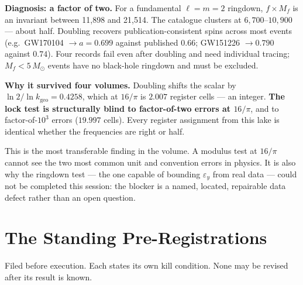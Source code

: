 \documentclass[11pt, letterpaper, openany]{book}
\newcommand{\kgeo}{k_{\mathrm{geo}}}
\begin{document}
\begin{formbox}
\textbf{Diagnosis: a factor of two.} For a fundamental $\ell=m=2$ ringdown, $f \times M_f$ is an
invariant between 11{,}898 and 21{,}514. The catalogue clusters at $6{,}700$--$10{,}900$ --- about
half. Doubling recovers publication-consistent spins across most events
(e.g.\ GW170104 $\to a = 0.699$ against published $0.66$; GW151226 $\to 0.790$ against $0.74$).
Four records fail even after doubling and need individual tracing;
$M_f < 5\,M_\odot$ events have no black-hole ringdown and must be excluded.

\medskip
\textbf{Why it survived four volumes.} Doubling shifts the scalar by
$\ln 2/\ln\kgeo = 0.4258$, which at $16/\pi$ is $\mathbf{2.007}$ register cells --- an integer.
\textbf{The lock test is structurally blind to factor-of-two errors at $16/\pi$}, and to
factor-of-$10^3$ errors ($19.997$ cells). Every register assignment from this lake is identical
whether the frequencies are right or half.
\end{formbox}

\begin{signalbox}
This is the most transferable finding in the volume. A modulus test at $16/\pi$ cannot see the two
most common unit and convention errors in physics. It is also why the ringdown test --- the one
capable of bounding $\varepsilon_y$ from real data --- could not be completed this session: the
blocker is a named, located, repairable data defect rather than an open question.
\end{signalbox}

\chapter{The Standing Pre-Registrations}

Filed before execution. Each states its own kill condition. None may be revised after its result is
known.
\end{document}
